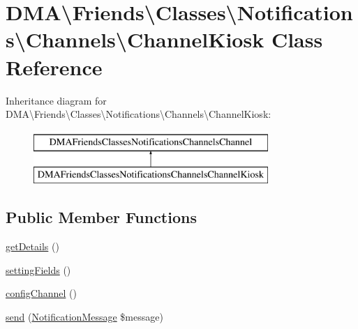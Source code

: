\hypertarget{classDMA_1_1Friends_1_1Classes_1_1Notifications_1_1Channels_1_1ChannelKiosk}{\section{D\+M\+A\textbackslash{}Friends\textbackslash{}Classes\textbackslash{}Notifications\textbackslash{}Channels\textbackslash{}Channel\+Kiosk Class Reference}
\label{classDMA_1_1Friends_1_1Classes_1_1Notifications_1_1Channels_1_1ChannelKiosk}
}
Inheritance diagram for D\+M\+A\textbackslash{}Friends\textbackslash{}Classes\textbackslash{}Notifications\textbackslash{}Channels\textbackslash{}Channel\+Kiosk\+:\begin{figure}[H]
\begin{center}
\leavevmode
\includegraphics[height=2.000000cm]{d5/d75/classDMA_1_1Friends_1_1Classes_1_1Notifications_1_1Channels_1_1ChannelKiosk}
\end{center}
\end{figure}
\subsection*{Public Member Functions}
\begin{DoxyCompactItemize}
\item 
\hyperlink{classDMA_1_1Friends_1_1Classes_1_1Notifications_1_1Channels_1_1ChannelKiosk_acbce00a29f080e7b4e6301a0f9edce34}{get\+Details} ()
\item 
\hyperlink{classDMA_1_1Friends_1_1Classes_1_1Notifications_1_1Channels_1_1ChannelKiosk_aed0a11ddc080fa7252d6fe6a3faa7b29}{setting\+Fields} ()
\item 
\hyperlink{classDMA_1_1Friends_1_1Classes_1_1Notifications_1_1Channels_1_1ChannelKiosk_ac40190da8647ca059590db8800bbbf2b}{config\+Channel} ()
\item 
\hyperlink{classDMA_1_1Friends_1_1Classes_1_1Notifications_1_1Channels_1_1ChannelKiosk_ab3ad4b0bf7c129767eb323528a439ed8}{send} (\hyperlink{classDMA_1_1Friends_1_1Classes_1_1Notifications_1_1NotificationMessage}{Notification\+Message} \$message)
\end{DoxyCompactItemize}
